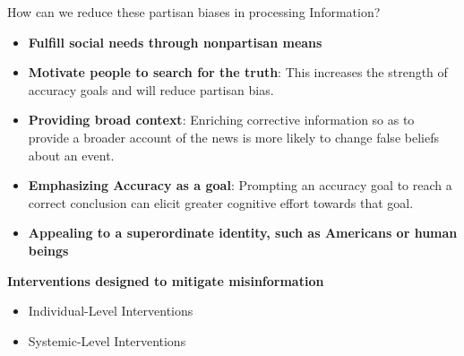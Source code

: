 \documentclass[nobackground,dvipsnames,table]{beamer}
\begin{document}
\begin{frame}{How can we reduce these partisan biases in processing Information?}

\begin{itemize}
    \item \textbf{Fulfill social needs through nonpartisan means}
    \item \textbf{Motivate people to search for the truth}: This increases the strength of accuracy goals and will reduce partisan bias.
    \item \textbf{Providing broad context}: Enriching corrective information so as to provide a broader account of the news is more likely to change false beliefs about an event.
    \item \textbf{Emphasizing Accuracy as a goal}: Prompting an accuracy goal to reach a correct conclusion can elicit greater cognitive effort towards that goal.
    \item \textbf{Appealing to a superordinate identity, such as Americans or human beings}

\end{itemize}

\note[]{

}
    
\end{frame}

\begin{frame}{}
\begin{minipage}{0.4\textwidth}
    \raggedright\Large{\textbf{Interventions designed to mitigate misinformation
    }}
\end{minipage}
\hspace{0.05\textwidth}
\begin{minipage}{0.5\textwidth}

    \begin{itemize}
        \item Individual-Level Interventions
        \item Systemic-Level Interventions
    \end{itemize}
\end{minipage}
\end{frame}
\end{document}
